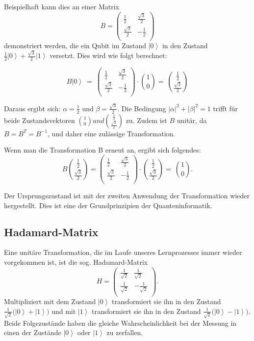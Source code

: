 Beispielhaft kann dies an einer Matrix $$B=\left(\begin{matrix}\frac{1}{2}&\frac{\sqrt3}{2}\\\frac{\sqrt3}{2}&-\frac{1}{2}\\\end{matrix}\right)$$ demonstriert werden, die ein Qubit im Zustand $\left|0\right\rangle$ in den Zustand $\frac{1}{2}\left|0\right\rangle+\frac{\sqrt3}{2}\left|1\right\rangle$ versetzt. Dies wird wie folgt berechnet:

$$B\left|\left.0\right\rangle\ =\ \right.\left(\begin{matrix}\frac{1}{2}&\frac{\sqrt3}{2}\\\frac{\sqrt3}{2}&-\frac{1}{2}\\\end{matrix}\right)\cdot\binom{1}{0}=\ \binom{\frac{1}{2}}{\frac{\sqrt3}{2}}$$

Daraus ergibt sich: $\alpha=\frac{1}{2}$ und $\beta=\frac{\sqrt3}{2}$. Die Bedingung $\left|\alpha\right|^2+\left|\beta\right|^2=1$ trifft für beide Zustandsvektoren $\binom{1}{0} und \binom{\frac{1}{2}}{\frac{\sqrt3}{2}}$ zu. Zudem ist $B$ unitär, da $B=B^T= B^{-1}$, und daher eine zulässige Transformation.

Wenn man die Transformation B erneut an, ergibt sich folgendes:
$$B\binom{\frac{1}{2}}{\frac{\sqrt3}{2}}=\left(\begin{matrix}\frac{1}{2}&\frac{\sqrt3}{2}\\\frac{\sqrt3}{2}&-\frac{1}{2}\\\end{matrix}\right)\cdot\binom{\frac{1}{2}}{\frac{\sqrt3}{2}}=\ \binom{1}{0}.$$

Der Ursprungszustand ist mit der zweiten Anwendung der Transformation wieder hergestellt. Dies ist eine der Grundprinzipien der Quanteninformatik.

\subsection{Hadamard-Matrix}

Eine unitäre Transformation, die im Laufe unseres Lernprozesses immer wieder vorgekommen ist, ist die sog. Hadamard-Matrix $$H=\left(\begin{matrix}\frac{1}{\sqrt2}&\frac{1}{\sqrt2}\\\frac{1}{\sqrt2}&-\frac{1}{\sqrt2}\\\end{matrix}\right).$$ Multipliziert mit dem Zustand $\left|0\right\rangle$ transformiert sie ihn in den Zustand $\frac{1}{\sqrt2}(\left|\left.0\right\rangle+\right.\left|\left.1\right\rangle)\right.$ und mit $\left|1\right\rangle$ transformiert sie ihn in den Zustand $\frac{1}{\sqrt2}(\left|\left.0\right\rangle-\right.\left|\left.1\right\rangle)\right.$. Beide Folgezustände haben die gleiche Wahrscheinlichkeit bei der Messung in einen der Zustände $\left|0\right\rangle$ oder $\left|1\right\rangle$ zu zerfallen.

